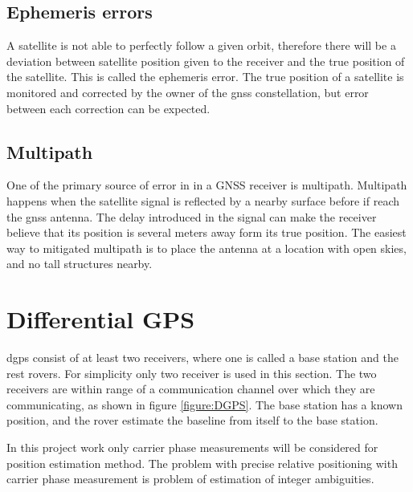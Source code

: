 \subsection{Ephemeris errors}
A satellite is not able to perfectly follow a given orbit, therefore there will be a deviation between satellite position given to the receiver and the true position of the satellite. This is called the ephemeris error. The true position of a satellite is monitored and corrected by the owner of the \gls{gnss} constellation, but error between each correction can be expected.
\subsection{Multipath}
One of the primary source of error in in a GNSS receiver is multipath. Multipath happens when the satellite signal is reflected by a nearby surface before if reach the \gls{gnss} antenna. The delay introduced in the signal can make the receiver believe that its position is several meters away form its true position. The easiest way to mitigated multipath is to place the antenna at a location with open skies, and no tall structures nearby.
\section{Differential GPS}
\acrfull{dgps} consist of at least two receivers, where one is called a base station and the rest rovers. For simplicity only two receiver is used in this section. The two receivers are within range of a communication channel over which they are communicating, as shown in figure \ref{figure:DGPS}. The base station has a known position, and the rover estimate the baseline from itself to the base station.

In this project work only carrier phase measurements will be considered for position estimation method.
The problem with precise relative positioning with carrier phase measurement is problem of estimation of integer ambiguities.

